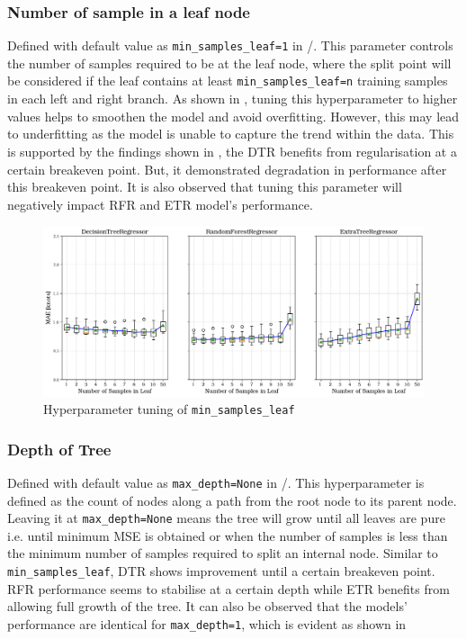 \subsubsection*{Number of sample in a leaf node}\label{sec:min_samples_leaf}

Defined with default value as {\tt min\_samples\_leaf=1} in \scikit/. This parameter controls the number of samples required to be at the leaf node, where the split point will be considered if the leaf contains at least {\tt min\_samples\_leaf=n} training samples in each left and right branch. As shown in , tuning this hyperparameter to higher values helps to smoothen the model and avoid overfitting. However, this may lead to underfitting as the model is unable to capture the trend within the data. This is supported by the findings shown in , the DTR benefits from regularisation at a certain breakeven point. But, it demonstrated degradation in performance after this breakeven point. It is also observed that tuning this parameter will negatively impact RFR and ETR model's performance. 

\begin{figure}[h]
    \centering
        \includegraphics[width=.85\textwidth]{02_figures/hpo_min_samples_leaf_mae.png}
        \caption{Hyperparameter tuning of {\tt min\_samples\_leaf}}
        \label{fig:hpo_min_samples_leaf}
\end{figure}

\subsubsection*{Depth of Tree}\label{sec:max_depth}

Defined with default value as {\tt max\_depth=None} in \scikit/. This hyperparameter is defined as the count of nodes along a path from the root node to its parent node. Leaving it at {\tt max\_depth=None} means the tree will grow until all leaves are pure i.e. until minimum MSE is obtained or when the number of samples is less than the minimum number of samples required to split an internal node. Similar to {\tt min\_samples\_leaf}, DTR shows improvement until a certain breakeven point. RFR performance seems to stabilise at a certain depth while ETR benefits from allowing full growth of the tree. It can also be observed that the models' performance are identical for {\tt max\_depth=1}, which is evident as shown in   

